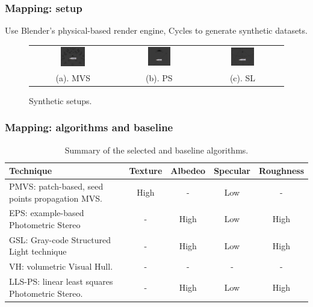 \documentclass{beamer}
\begin{document}
\begin{frame}
\frametitle{Mapping: setup}

Use Blender's physical-based render engine, Cycles to generate synthetic datasets.
\begin{figure}
\centering
\begin{tabular}{ccc}
\includegraphics[width=0.3\textwidth]{mapping/setup/mvs_setup} &
\includegraphics[width=0.3\textwidth]{mapping/setup/ps_setup} &
\includegraphics[width=0.3\textwidth]{mapping/setup/sl_setup} \\
(a). MVS & (b). PS & (c). SL\\
\end{tabular}
\caption{Synthetic setups.}
\end{figure}

\end{frame}

\begin{frame}
\frametitle{Mapping: algorithms and baseline}

\begin{table}[!htbp]
\centering
\begin{tabular}{p{4cm}|c|c|c|c}
\toprule
Technique & Texture & Albedeo & Specular & Roughness\\
\midrule
PMVS: patch-based, seed points propagation MVS. & High & - & Low & -\\
\midrule
EPS: example-based Photometric Stereo & - & High & Low & High \\
\midrule
GSL: Gray-code Structured Light technique & - & High & Low & High\\
\midrule\midrule
VH: volumetric Visual Hull. & - & - & - & -\\
\midrule
LLS-PS: linear least squares Photometric Stereo. & - & High & Low & High\\
\bottomrule
\end{tabular}
\caption{Summary of the selected and baseline algorithms.}
\end{table}

\end{frame}
\end{document}
